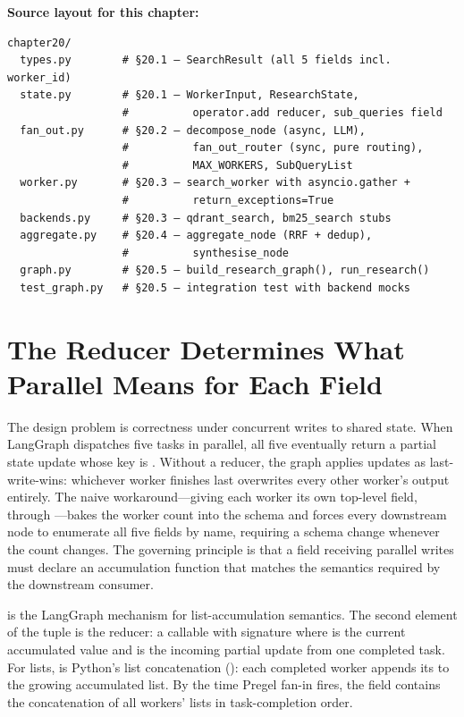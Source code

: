 \medskip
\noindent\textbf{Source layout for this chapter:}
\begin{verbatim}
chapter20/
  types.py        # §20.1 — SearchResult (all 5 fields incl. worker_id)
  state.py        # §20.1 — WorkerInput, ResearchState,
                  #          operator.add reducer, sub_queries field
  fan_out.py      # §20.2 — decompose_node (async, LLM),
                  #          fan_out_router (sync, pure routing),
                  #          MAX_WORKERS, SubQueryList
  worker.py       # §20.3 — search_worker with asyncio.gather +
                  #          return_exceptions=True
  backends.py     # §20.3 — qdrant_search, bm25_search stubs
  aggregate.py    # §20.4 — aggregate_node (RRF + dedup),
                  #          synthesise_node
  graph.py        # §20.5 — build_research_graph(), run_research()
  test_graph.py   # §20.5 — integration test with backend mocks
\end{verbatim}


\section{The Reducer Determines What Parallel Means for Each Field}
\label{sec:reducers-parallel}

The design problem is correctness under concurrent writes to shared
state. When LangGraph dispatches five  tasks in
parallel, all five eventually return a partial state update whose key is
. Without a reducer, the graph applies updates as
last-write-wins: whichever worker finishes last overwrites every other
worker's output entirely. The naive workaround---giving each worker its
own top-level field,  through
---bakes the worker count into the schema and
forces every downstream node to enumerate all five fields by name,
requiring a schema change whenever the count changes. The governing
principle is that a field receiving parallel writes must declare an
accumulation function that matches the semantics required by the
downstream consumer.

 is the LangGraph mechanism for
list-accumulation semantics. The second element of the 
tuple is the reducer: a callable with signature  where  is the current accumulated value and
 is the incoming partial update from one completed task.
For lists,  is Python's list concatenation
(): each completed worker appends its
 to the growing accumulated list. By the time
Pregel fan-in fires, the field contains the concatenation of all workers'
lists in task-completion order.

